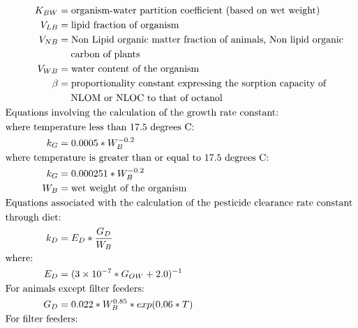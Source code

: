 \documentclass[10pt]{article}
\begin{document}
\begin{align*}
K_{BW} & = \text{organism-water partition coefficient (based on wet weight)} \nonumber\\
V_{LB} & = \text{lipid fraction of organism} \nonumber\\
V_{NB} & = \text{Non Lipid organic matter fraction of animals, Non lipid organic}\nonumber \\ &\hspace{1.3em} \text{carbon of plants} \nonumber\\
V_{WB} & = \text{water content of the organism} \nonumber\\
\beta & = \text{proportionality constant expressing the sorption capacity of}\nonumber \\ &\hspace{1.3em} \text{NLOM or NLOC to that of octanol} \nonumber\\
&    \hspace{-.75in}  \text{Equations involving the calculation of the growth rate constant:}\nonumber \\
&    \hspace{-.75in}  \text{where temperature less than 17.5 degrees C:} \nonumber \\
k_{G} & = 0.0005*W_{B}^{-0.2}\nonumber \\
&    \hspace{-.75in}  \text{where temperature is greater than or equal to 17.5 degrees C:} \nonumber \\
k_{G} & = 0.000251*W_{B}^{-0.2}\nonumber \\
W_{B} & = \text{wet weight of the organism} \nonumber\\
&    \hspace{-.75in}  \text{Equations associated with the calculation of the pesticide clearance rate constant}\nonumber \\ &\hspace{-0.75in} \text{through diet:} \nonumber \\
k_{D} & = E_{D}*\frac{G_{D}}{W_{B}} \nonumber \\
&    \hspace{-.75in}  \text{where:} \nonumber \\
E_{D} & = (\num{.0000003}*G_{OW}+2.0)^{-1} \nonumber \\
&    \hspace{-.75in}  \text{For animals except filter feeders:} \nonumber \\
G_{D} & = 0.022*W_{B}^{0.85}*exp(0.06*T) \nonumber \\
&    \hspace{-.75in}  \text{For filter feeders:} \nonumber \\

\end{align*}
\end{document}
